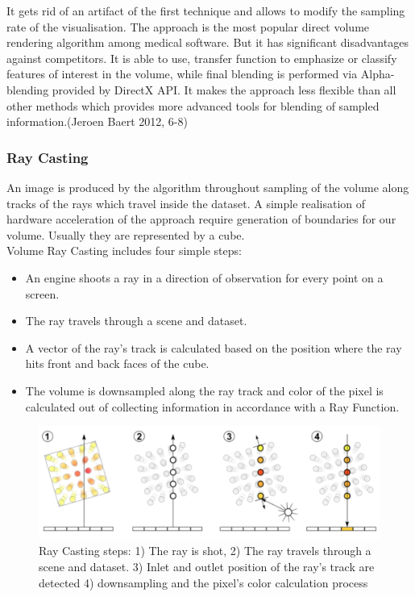 \documentclass[twoside, english, 11pt]{report}
\begin{document}
It gets rid of an artifact of the first technique and allows to modify the sampling rate of the visualisation. The approach is the most popular direct volume rendering algorithm among medical software. But it has significant disadvantages against competitors. It is able to use, transfer function to emphasize or classify features of interest in the volume, while final blending is performed via Alpha-blending provided by DirectX API. It makes the approach less flexible than all other methods which provides more advanced tools for blending of sampled information.(Jeroen Baert 2012, 6-8)

\subsubsection{Ray Casting}

An image is produced by the algorithm throughout sampling of the volume along tracks of the rays which travel inside the dataset. A simple realisation of hardware acceleration of the approach require generation of boundaries for our volume. Usually they are represented by a cube.\\

Volume Ray Casting includes four simple steps:
\begin{itemize} \item An engine shoots a ray in a direction of observation for every point on a screen.
\item The ray travels through a scene and dataset.
\item A vector of the ray's track is calculated based on the position where the ray hits front and back faces of the cube.
\item The volume is downsampled along the ray track and color of the pixel is calculated out of collecting information in accordance with a Ray Function.
\end{itemize}
\begin{figure}[!h]
\centerline{\includegraphics[scale=0.35]{img/rayCast}}
\caption{Ray Casting steps: 1) The ray is shot, 2) The ray travels through a scene and dataset. 3) Inlet and outlet position of the ray's track are detected 4) downsampling and the pixel's color calculation process}
\end{figure}
\end{document}
